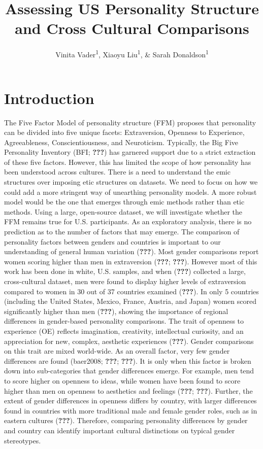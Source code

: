 \documentclass[
  english,
  man]{apa6}
\title{Assessing US Personality Structure and Cross Cultural Comparisons}
\author{Vinita Vader\textsuperscript{1}, Xiaoyu Liu\textsuperscript{1}, \& Sarah Donaldson\textsuperscript{1}}
\date{}
\affiliation{\vspace{0.5cm}\textsuperscript{1} University of Oregon}
\begin{document}
\maketitle

\hypertarget{introduction}{%
\section{Introduction}\label{introduction}}

The Five Factor Model of personality structure (FFM) proposes that personality can be divided into five unique facets: Extraversion, Openness to Experience, Agreeableness, Conscientiousness, and Neuroticism. Typically, the Big Five Personality Inventory (BFI; {\textbf{???}}) has garnered support due to a strict extraction of these five factors. However, this has limited the scope of how personality has been understood across cultures. There is a need to understand the emic structures over imposing etic structures on datasets. We need to focus on how we could add a more stringent way of unearthing personality models. A more robust model would be the one that emerges through emic methods rather than etic methods. Using a large, open-source dataset, we will investigate whether the FFM remains true for U.S. participants. As an exploratory analysis, there is no prediction as to the number of factors that may emerge.
The comparison of personality factors between genders and countries is important to our understanding of general human variation ({\textbf{???}}). Most gender comparisons report women scoring higher than men in extraversion ({\textbf{???}}; {\textbf{???}}). However most of this work has been done in white, U.S. samples, and when ({\textbf{???}}) collected a large, cross-cultural dataset, men were found to display higher levels of extraversion compared to women in 30 out of 37 countries examined ({\textbf{???}}). In only 5 countries (including the United States, Mexico, France, Austria, and Japan) women scored significantly higher than men ({\textbf{???}}), showing the importance of regional differences in gender-based personality comparisons.
The trait of openness to experience (OE) reflects imagination, creativity, intellectual curiosity, and an appreciation for new, complex, aesthetic experiences ({\textbf{???}}). Gender comparisons on this trait are mixed world-wide. As an overall factor, very few gender differences are found (baer2008; {\textbf{???}}; {\textbf{???}}). It is only when this factor is broken down into sub-categories that gender differences emerge. For example, men tend to score higher on openness to ideas, while women have been found to score higher than men on openness to aesthetics and feelings ({\textbf{???}}; {\textbf{???}}). Further, the extent of gender differences in openness differs by country, with larger differences found in countries with more traditional male and female gender roles, such as in eastern cultures ({\textbf{???}}). Therefore, comparing personality differences by gender and country can identify important cultural distinctions on typical gender stereotypes.
\end{document}
